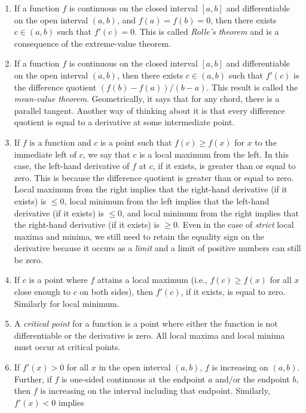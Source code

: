 \documentclass{amsart}
\begin{document}
\begin{enumerate}
\item If a function $f$ is continuous on the closed interval $[a,b]$
  and differentiable on the open interval $(a,b)$, and $f(a) = f(b) =
  0$, then there exists $c \in (a,b)$ such that $f'(c) = 0$. This is
  called {\em Rolle's theorem} and is a consequence of the
  extreme-value theorem.
\item If a function $f$ is continuous on the closed interval $[a,b]$
  and differentiable on the open interval $(a,b)$, then there exists
  $c \in (a,b)$ such that $f'(c)$ is the difference quotient $(f(b) -
  f(a))/(b - a)$. This result is called the {\em mean-value
  theorem}. Geometrically, it says that for any chord, there is a
  parallel tangent. Another way of thinking about it is that every
  difference quotient is equal to a derivative at some intermediate
  point.
\item If $f$ is a function and $c$ is a point such that $f(c) \ge
  f(x)$ for $x$ to the immediate left of $c$, we say that $c$ is a
  local maximum from the left. In this case, the left-hand derivative
  of $f$ at $c$, if it exists, is greater than or equal to zero. This
  is because the difference quotient is greater than or equal to
  zero. Local maximum from the right implies that the right-hand
  derivative (if it exists) is $\le 0$, local minimum from the left
  implies that the left-hand derivative (if it exists) is $\le 0$, and
  local minimum from the right implies that the right-hand derivative
  (if it exists) is $\ge 0$. Even in the case of {\em strict} local
  maxima and minima, we still need to retain the equality sign on the
  derivative because it occurs as a {\em limit} and a limit of
  positive numbers can still be zero.
\item If $c$ is a point where $f$ attains a local maximum (i.e., $f(c)
  \ge f(x)$ for all $x$ close enough to $c$ on both sides), then
  $f'(c)$, if it exists, is equal to zero. Similarly for local
  minimum.
\item A {\em critical point} for a function is a point where either
  the function is not differentiable or the derivative is zero. All
  local maxima and local minima must occur at critical points.
\item If $f'(x) > 0$ for all $x$ in the open interval $(a,b)$, $f$ is
  increasing on $(a,b)$. Further, if $f$ is one-sided continuous at
  the endpoint $a$ and/or the endpoint $b$, then $f$ is increasing on
  the interval including that endpoint. Similarly, $f'(x) < 0$ implies

\end{enumerate}
\end{document}
